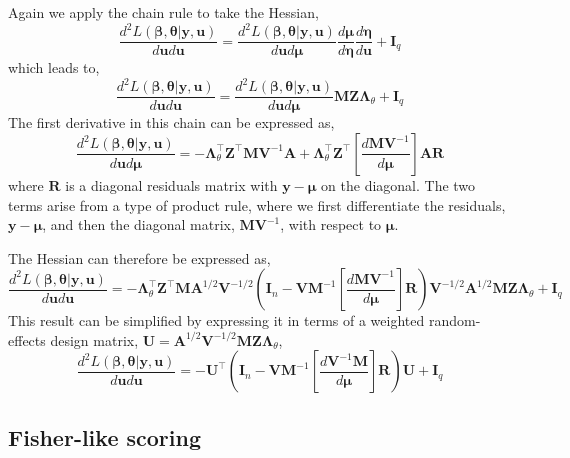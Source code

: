 \documentclass{jss}
\begin{document}
Again we apply the chain rule to take the Hessian,
\begin{equation}
  \frac{d^2 L(\bm\beta, \bm\theta | \bm y, \bm u)}{d \bm u d \bm u} = 
  \frac{d^2 L(\bm\beta, \bm\theta | \bm y, \bm u)}{d \bm u d \bm\mu}
  \frac{d \bm\mu}{d \bm\eta}
  \frac{d \bm\eta}{d \bm u} + \bm I_q
\end{equation}
which leads to,
\begin{equation}
  \frac{d^2 L(\bm\beta, \bm\theta | \bm y, \bm u)}{d \bm u d \bm u} = 
  \frac{d^2 L(\bm\beta, \bm\theta | \bm y, \bm u)}{d \bm u d \bm\mu}\bm
  M \bm Z \bm\Lambda_\theta 
  + \bm I_q
\end{equation}
The first derivative in this chain can be expressed as,
\begin{equation}
  \frac{d^2 L(\bm\beta, \bm\theta | \bm y, \bm u)}{d \bm u d \bm\mu} =
  -\bm\Lambda_\theta^\top \bm Z^\top \bm M \bm V^{-1} \bm A  + 
  \bm\Lambda_\theta^\top \bm Z^\top \left[ \frac{d \bm M \bm V^{-1}}{d \bm\mu} \right] \bm A \bm R
\end{equation}
where $\bm R$ is a diagonal residuals matrix with $\bm y-\bm\mu$ on
the diagonal. The two terms arise from a type of product rule, where
we first differentiate the residuals, $\bm y-\bm\mu$, and then the
diagonal matrix, $\bm M \bm V^{-1}$, with respect to $\bm\mu$.

The Hessian can therefore be expressed as,
\begin{equation}
  \frac{d^2 L(\bm\beta, \bm\theta | \bm y, \bm u)}{d \bm u d \bm u} = 
  -\bm \Lambda_\theta^\top \bm Z^\top \bm M \bm A^{1/2}\bm V^{-1/2}\left( 
    \bm I_n - 
    \bm V \bm M^{-1}\left[ \frac{d \bm M \bm V^{-1}}{d \bm\mu} \right] \bm R
  \right) \bm V^{-1/2}\bm A^{1/2} \bm M \bm Z \bm\Lambda_\theta + \bm I_q
\label{eq:betaHessian}
\end{equation}
This result can be simplified by expressing it in terms of a weighted
random-effects design matrix, $\bm U = \bm A^{1/2}\bm V^{-1/2}\bm M
\bm Z \bm\Lambda_\theta$,
\begin{equation}
  \frac{d^2 L(\bm\beta, \bm\theta | \bm y, \bm u)}{d \bm u d \bm u} = 
  -\bm U^\top\left( 
    \bm I_n - 
    \bm V \bm M^{-1}\left[ \frac{d \bm V^{-1}\bm M}{d \bm\mu} \right] \bm R
  \right) \bm U + \bm I_q
\label{eq:betaHessian}
\end{equation}

\subsection{Fisher-like scoring}
\end{document}
